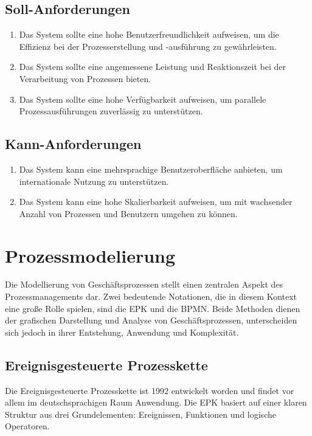 \subsection*{Soll-Anforderungen}
\begin{enumerate}[label=\textbf{NS\arabic*.}]
    \item Das System sollte eine hohe Benutzerfreundlichkeit aufweisen, um die Effizienz bei der Prozesserstellung und -ausführung zu gewährleisten.
    \item Das System sollte eine angemessene Leistung und Reaktionszeit bei der Verarbeitung von Prozessen bieten.
    \item Das System sollte eine hohe Verfügbarkeit aufweisen, um parallele Prozessausführungen zuverlässig zu unterstützen.
\end{enumerate}
\subsection*{Kann-Anforderungen}
\begin{enumerate}[label=\textbf{NK\arabic*.}]
    \item Das System kann eine mehrsprachige Benutzeroberfläche anbieten, um internationale Nutzung zu unterstützen.
    \item Das System kann eine hohe Skalierbarkeit aufweisen, um mit wachsender Anzahl von Prozessen und Benutzern umgehen zu können.
\end{enumerate}

\newpage
\section{Prozessmodelierung}
Die Modellierung von Geschäftsprozessen stellt einen zentralen Aspekt des Prozessmanagements dar. Zwei bedeutende Notationen, die in diesem Kontext eine große Rolle spielen, sind die \ac{EPK} und die \ac{BPMN}. Beide Methoden dienen der grafischen Darstellung und Analyse von Geschäftsprozessen, unterscheiden sich jedoch in ihrer Entstehung, Anwendung und Komplexität.

\subsection{Ereignisgesteuerte Prozesskette}
Die Ereignisgesteuerte Prozesskette ist 1992 entwickelt worden und findet vor allem im deutschsprachigen Raum Anwendung. 
Die \ac{EPK} basiert auf einer klaren Struktur aus drei Grundelementen: Ereignissen, Funktionen und logische Operatoren.

